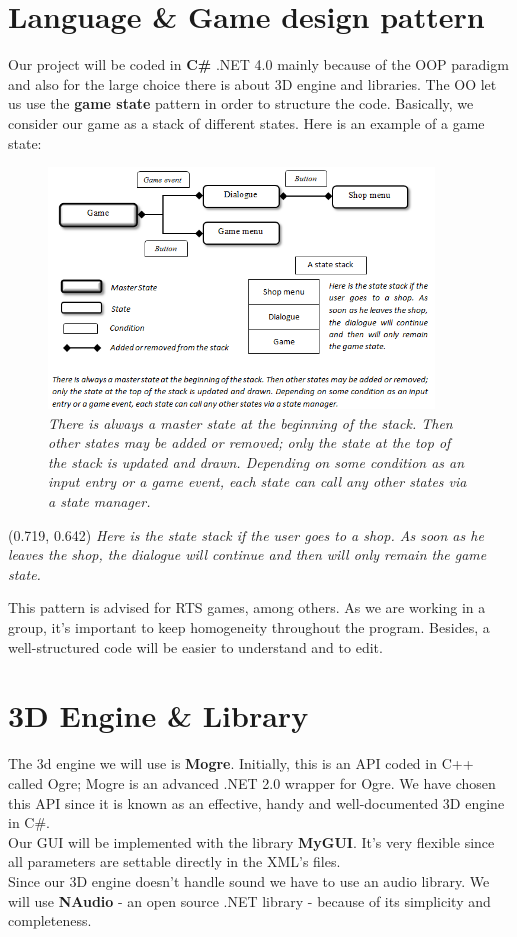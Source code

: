 \documentclass[article]{report} %
\begin{document}
     				\section{Language \& Game design pattern}
     						Our project will be coded in \textbf{C\#} .NET 4.0 mainly because of the \ac{OOP} paradigm and also for the large choice there is about 3D engine and libraries. The OO let us use the \textbf{game state} pattern in order to structure the code. Basically, we consider our game as a stack of different states. Here is an example of a game state:
							\begin{figure}[h]
							\centering
							\includegraphics[height=242px]{Images/GameStateDesign.png}
							\it \\ There is always a master state at the beginning of the stack. Then other states may be added or removed; only the state at the top of the stack is updated and drawn. Depending on some condition as an input entry or a game event, each state can call any other states via a state manager.
							\end{figure}

							\begin{textblock}{0.128}(0.719, 0.642)
							\noindent \it 	Here is the state stack if the user goes to a shop. As soon as he leaves the shop, the dialogue will continue and then will only remain the game state.
							\end{textblock}
     						
     						This pattern is advised for \ac{RTS} games, among others. As we are working in a group, it\textquoteright s important to keep homogeneity throughout the program. Besides, a well-structured code will be easier to understand and to edit.
						\section{3D Engine \& Library}
						The 3d engine we will use is \textbf{\ac{Mogre}}. Initially, this is an \ac{API} coded in C++ called Ogre; Mogre is an advanced .NET 2.0 wrapper for Ogre. We have chosen this \ac{API} since it is known as an effective, handy and well-documented 3D engine in C\#.\\			
						Our \ac{GUI} will be implemented with the library \textbf{\ac{MyGUI}}. It’s very flexible since all parameters are settable directly in the XML\textquoteright s files.\\	
						Since our 3D engine doesn\textquoteright t handle sound we have to use an audio library. We will use \textbf{NAudio} - an open source .NET library - because of its simplicity and completeness.
\end{document}
